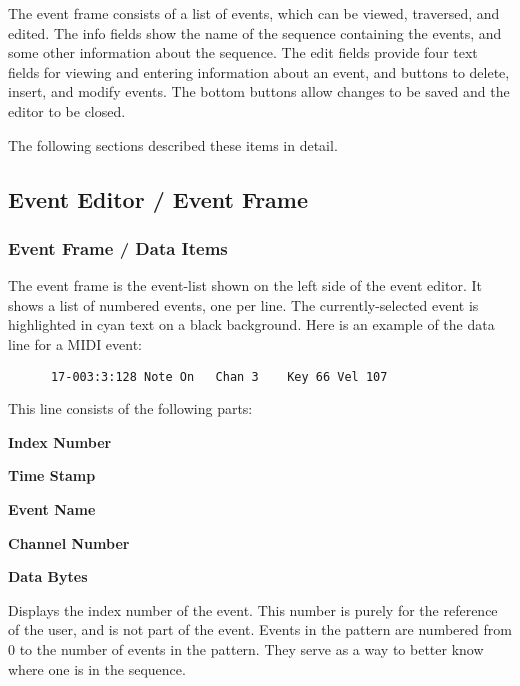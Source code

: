    The event frame consists of a list of events, which can be
   viewed, traversed, and edited.  The info fields show the name of the
   sequence containing the events, and some other information about the
   sequence.  The edit fields provide four text fields for viewing and entering
   information about an event, and buttons to delete, insert, and modify
   events.  The bottom buttons allow changes to be saved and the editor to be
   closed.  

   The following sections described these items in detail.

\subsection{Event Editor / Event Frame}
\label{subsec:seq64_event_editor_frame}

\subsubsection{Event Frame / Data Items}
\label{subsec:seq64_event_frame_data}

   The event frame is the event-list shown on the left side of the
   event editor.  It shows a list of numbered events, one per line.
   The currently-selected event is highlighted in cyan text on a black
   background.  Here is an example of the data line for a MIDI event:

   \begin{verbatim}
      17-003:3:128 Note On   Chan 3    Key 66 Vel 107
   \end{verbatim}

   This line consists of the following parts:

   \begin{enumber}
      \item \textbf{Index Number}
      \item \textbf{Time Stamp}
      \item \textbf{Event Name}
      \item \textbf{Channel Number}
      \item \textbf{Data Bytes}
   \end{enumber}

   \setcounter{ItemCounter}{0}      %

   Displays the index number of the event.
   This number is purely for the reference of the user, and is not part
   of the event.  Events in the pattern are numbered from 0 to the number of
   events in the pattern.  They serve as a way to better know where one is in
   the sequence.


